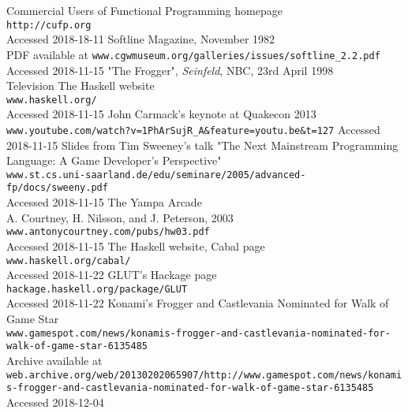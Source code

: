 \documentclass[12pt, a4paper]{report}
\begin{document}
\begin{thebibliography}{0}
    Commercial Users of Functional Programming homepage\\
    \verb|http://cufp.org|\\
    Accessed 2018-18-11
    Softline Magazine, November 1982\\
    PDF available at \verb|www.cgwmuseum.org/galleries/issues/softline_2.2.pdf|\\
    Accessed 2018-11-15
    "The Frogger", \textit{Seinfeld}, NBC, 23rd April 1998\\
    Television
    The Haskell website\\
    \verb|www.haskell.org/|\\
    Accessed 2018-11-15
    John Carmack's keynote at Quakecon 2013\\
    \verb|www.youtube.com/watch?v=1PhArSujR_A&feature=youtu.be&t=127|
    Accessed 2018-11-15
    Slides from Tim Sweeney's talk "The Next Mainstream Programming Language: A Game Developer’s Perspective"\\
    \verb|www.st.cs.uni-saarland.de/edu/seminare/2005/advanced-fp/docs/sweeny.pdf|\\
    Accessed 2018-11-15
    The Yampa Arcade\\
    A. Courtney, H. Nilsson, and J. Peterson, 2003\\
    \verb|www.antonycourtney.com/pubs/hw03.pdf|\\
    Accessed 2018-11-15
    The Haskell website, Cabal page\\
    \verb|www.haskell.org/cabal/|\\
    Accessed 2018-11-22
    GLUT's Hackage page\\
    \verb|hackage.haskell.org/package/GLUT|\\
    Accessed 2018-11-22
    Konami's Frogger and Castlevania Nominated for Walk of Game Star\\
    \verb|www.gamespot.com/news/konamis-frogger-and-castlevania-nominated-for-walk-of-game-star-6135485|\\
    Archive available at \verb|web.archive.org/web/20130202065907/http://www.gamespot.com/news/konamis-frogger-and-castlevania-nominated-for-walk-of-game-star-6135485|\\
    Accessed 2018-12-04

\end{thebibliography}
\end{document}
